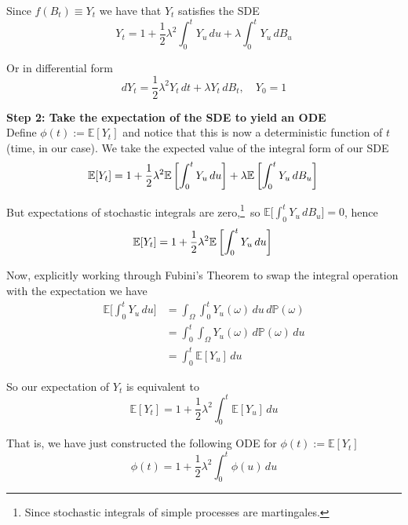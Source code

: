 \documentclass[12pt]{article}
\newlength\tindent
\renewcommand{\indent}{\hspace*{\tindent}}
\begin{document}
Since $f(B_t) \equiv Y_t$ we have that $Y_t$ satisfies the SDE
\begin{equation*}
	Y_t = 1 + \frac{1}{2}\lambda^2\int^t_0 Y_u\,du + \lambda\int^t_0 Y_u\,dB_u
\end{equation*}

Or in differential form
\begin{equation*}
	dY_t = \frac{1}{2}\lambda^2Y_t\,dt + \lambda Y_t\,dB_t, \quad Y_0 = 1
\end{equation*}

{\bf Step 2: Take the expectation of the SDE to yield an ODE} \\

\indent Define $\phi(t) := \mathbb E[Y_t]$ and notice that this is now a deterministic function of $t$ (time, in our case). We take the expected value of the integral form of our SDE
\begin{equation*}
	\mathbb E[Y_t] = 1 + \frac{1}{2}\lambda^2\mathbb E\left[\int^t_0 Y_u\,du\right] + \lambda\mathbb E\left[\int^t_0 Y_u\,dB_u\right] \\
\end{equation*}

But expectations of stochastic integrals are zero,\footnote{Since stochastic integrals of simple processes are martingales.}~so $\mathbb E\Big[\int^t_0 Y_u\,dB_u\Big] = 0$, hence
\begin{equation*}	
	\mathbb E[Y_t] = 1 + \frac{1}{2}\lambda^2\mathbb E\left[\int^t_0 Y_u\,du\right]\\
\end{equation*}

\indent Now, explicitly working through Fubini's Theorem to swap the integral operation with the expectation we have
\begin{align*}
	\mathbb E\Big[\int^t_0 Y_u\,du\Big] &= \int_\Omega\int^t_0 Y_u(\omega)\,du\,d\mathbb P(\omega) \\
	&= \int^t_0\int_\Omega Y_u(\omega)\,d\mathbb P(\omega)\,du \\
	&= \int^t_0 \mathbb E[Y_u]\,du
\end{align*}

So our expectation of $Y_t$ is equivalent to
\begin{equation*}
	\mathbb E[Y_t] = 1 + \frac{1}{2}\lambda^2 \int^t_0 \mathbb E[Y_u]\,du
\end{equation*}

That is, we have just constructed the following ODE for $\phi(t) := \mathbb E[Y_t]$
\begin{equation*}
	\phi(t) = 1 + \frac{1}{2}\lambda^2\int^t_0\phi(u)\,du
\end{equation*}
\end{document}
